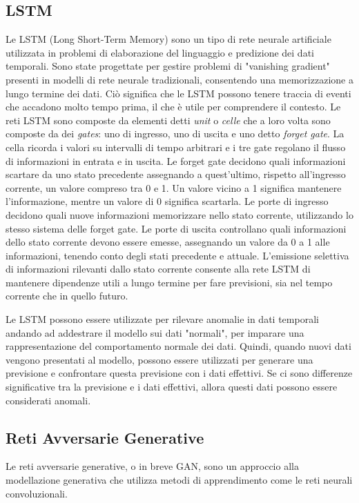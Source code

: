 \subsection{LSTM}
Le LSTM (Long Short-Term Memory) sono un tipo di rete neurale artificiale utilizzata in problemi di elaborazione del linguaggio e predizione dei dati temporali. Sono state progettate per gestire problemi di "vanishing gradient" presenti in modelli di rete neurale tradizionali, consentendo una memorizzazione a lungo termine dei dati. Ciò significa che le LSTM possono tenere traccia di eventi che accadono molto tempo prima, il che è utile per comprendere il contesto.
Le reti LSTM sono composte da elementi detti \textit{unit} o \textit{celle} che a loro volta sono composte da dei \textit{gates}: uno di ingresso, uno di uscita e uno detto \textit{forget gate}. La cella ricorda i valori su intervalli di tempo arbitrari e i tre gate regolano il flusso di informazioni in entrata e in uscita. Le forget gate decidono quali informazioni scartare da uno stato precedente assegnando a quest'ultimo, rispetto all'ingresso corrente, un valore compreso tra 0 e 1. Un valore vicino a 1 significa mantenere l'informazione, mentre un valore di 0 significa scartarla. Le porte di ingresso decidono quali nuove informazioni memorizzare nello stato corrente, utilizzando lo stesso sistema delle forget gate. Le porte di uscita controllano quali informazioni dello stato corrente devono essere emesse, assegnando un valore da 0 a 1 alle informazioni, tenendo conto degli stati precedente e attuale. L'emissione selettiva di informazioni rilevanti dallo stato corrente consente alla rete LSTM di mantenere dipendenze utili a lungo termine per fare previsioni, sia nel tempo corrente che in quello futuro.

Le LSTM possono essere utilizzate per rilevare anomalie in dati temporali andando ad addestrare il modello sui dati "normali", per imparare una rappresentazione del comportamento normale dei dati. Quindi, quando nuovi dati vengono presentati al modello, possono essere utilizzati per generare una previsione e confrontare questa previsione con i dati effettivi. Se ci sono differenze significative tra la previsione e i dati effettivi, allora questi dati possono essere considerati anomali.


\subsection{Reti Avversarie Generative}
Le reti avversarie generative, o in breve GAN, sono un approccio alla modellazione generativa che utilizza metodi di apprendimento come le reti neurali convoluzionali.

